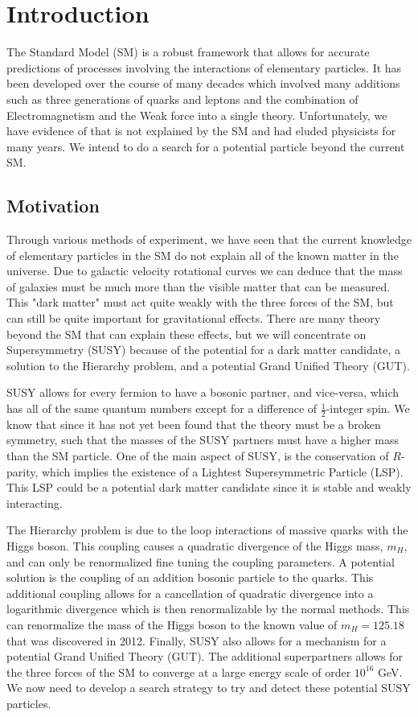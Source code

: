 \chapter{Introduction}
\label{ch:Intro}

The Standard Model (SM) is a robust framework that allows for accurate predictions of processes involving the interactions of elementary particles. It has been developed over the course of many decades which involved many additions such as three generations of quarks and leptons and the combination of Electromagnetism and the Weak force into a single theory. Unfortunately, we have evidence of that is not explained by the SM and had eluded physicists for many years. We intend to do a search for a potential particle beyond the current SM.

\section{Motivation}
\label{sec:Motivation}

Through various methods of experiment, we have seen that the current knowledge of elementary particles in the SM do not explain all of the known matter in the universe. Due to galactic velocity rotational curves we can deduce that the mass of galaxies must be much more than the visible matter that can be measured. This "dark matter" must act quite weakly with the three forces of the SM, but can still be quite important for gravitational effects. There are many theory beyond the SM that can explain these effects, but we will concentrate on Supersymmetry (SUSY) because of the potential for a dark matter candidate, a solution to the Hierarchy problem, and a potential Grand Unified Theory (GUT).

SUSY allows for every fermion to have a bosonic partner, and vice-versa, which has all of the same quantum numbers except for a difference of $\frac{1}{2}$-integer spin. We know that since it has not yet been found that the theory must be a broken symmetry, such that the masses of the SUSY partners must have a higher mass than the SM particle. One of the main aspect of SUSY, is the conservation of $R$-parity, which implies the existence of a Lightest Supersymmetric Particle (LSP). This LSP could be a potential dark matter candidate since it is stable and weakly interacting. 

The Hierarchy problem is due to the loop interactions of massive quarks with the Higgs boson. This coupling causes a quadratic divergence of the Higgs mass, $m_H$, and can only be renormalized fine tuning the coupling parameters. A potential solution is the coupling of an addition bosonic particle to the quarks. This additional coupling allows for a cancellation of quadratic divergence into a logarithmic divergence which is then renormalizable by the normal methods. This can renormalize the mass of the Higgs boson to the known value of $m_H=125.18$ \GeV{} that was discovered in 2012. Finally, SUSY also allows for a mechanism for a potential Grand Unified Theory (GUT). The additional superpartners allows for the three forces of the SM to converge at a large energy scale of order $10^{16}$ GeV. We now need to develop a search strategy to try and detect these potential SUSY particles.

